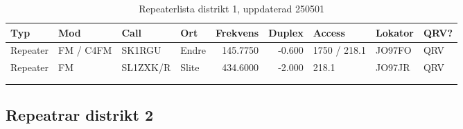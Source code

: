 \begin{longtable}{llllrrlll}
\bf Typ  & \bf Mod     & \bf Call & \bf Ort     & \bf Frekvens & \bf Duplex & \bf Access & \bf Lokator & \bf QRV? \\ \hline
Repeater   & FM / C4FM & SK1RGU   & Endre        & 145.7750     & -0.600     & 1750 / 218.1 & JO97FO      & QRV      \\
Repeater   & FM        & SL1ZXK/R & Slite        & 434.6000     & -2.000     & 218.1        & JO97JR      & QRV      \\
\vspace{1 ex}                                                                                                        \\
\caption{Repeaterlista distrikt 1, uppdaterad 250501}                                                                \\
\end{longtable}

\subsection{Repeatrar distrikt 2}

